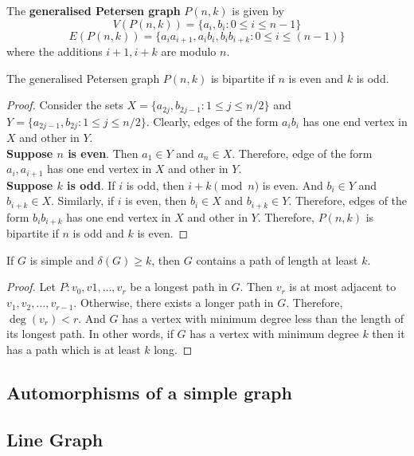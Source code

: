 \begin{definition}
	The \textbf{generalised Petersen graph} $P(n,k)$ is given by
	$$ V(P(n,k)) = \{ a_i,b_i : 0 \le i \le n-1 \} $$
	$$ E(P(n,k)) = \{ a_ia_{i+1}, a_ib_i, b_ib_{i+k} : 0 \le i \le (n-1) \}$$
	where the additions $i+1, i+k$ are modulo $n$.
\end{definition}
\begin{exercise}
	The generalised Petersen graph $P(n,k)$ is bipartite if $n$ is even and $k$ is odd.
\end{exercise}
\begin{proof}
	Consider the sets $X = \{ a_{2j}, b_{2j-1} : 1 \le j \le n/2 \}$ and $Y = \{ a_{2j-1}, b_{2j} : 1 \le j \le n/2 \}$. Clearly, edges of the form $a_ib_i$ has one end vertex in $X$ and other in $Y$.\\

	\textbf{Suppose $n$ is even}. Then $a_1 \in Y$ and $a_n \in X$. Therefore, edge of the form $a_i,a_{i+1}$ has one end vertex in $X$ and other in $Y$.\\

	\textbf{Suppose $k$ is odd}. If $i$ is odd, then $i+k \pmod{n}$ is even. And $b_i \in Y$ and $b_{i+k} \in X$. Similarly, if $i$ is even, then $b_i \in X$ and $b_{i+k} \in Y$. Therefore, edges of the form $b_ib_{i+k}$ has one end vertex in $X$ and other in $Y$.
	Therefore, $P(n,k)$ is bipartite if $n$ is odd and $k$ is even.
\end{proof}

\begin{exercise}
	If $G$ is simple and $\delta(G) \ge k$, then $G$ contains a path of length at least $k$.
\end{exercise}
\begin{proof}
	Let $P : v_0,v1,\dots,v_r$ be a longest path in $G$.
	Then $v_r$ is at most adjacent to $v_1,v_2,\dots,v_{r-1}$. Otherwise, there exists a longer path in $G$.
	Therefore, $\deg(v_r) < r$. And $G$ has a vertex with minimum degree less than the length of its longest path.
	In other words, if $G$ has a vertex with minimum degree $k$ then it has a path which is at least $k$ long.
\end{proof}

\subsection{Automorphisms of a simple graph}

\subsection{Line Graph}

